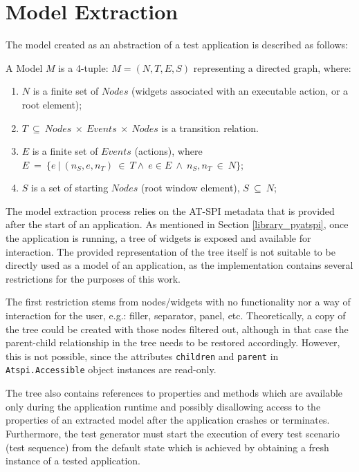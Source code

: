 \section{Model Extraction}\label{model}
 

The model created as an abstraction of a test application is described as follows: 

\theoremstyle{definition}
\begin{definition}
A Model $M$ is a 4-tuple: $M = (N, T, E, S)$ representing a directed graph, where:
\begin{enumerate}
\item $N$ is a finite set of $Nodes$ (widgets associated with an executable action, or a root element);
\item $T\ \subseteq\ Nodes\ \times \ Events\ \times \ Nodes$ is a transition relation.
\item $E$ is a finite set of $Events$ (actions), where  $E\ =\ \{e\ |\ (n_S, e, n_T)\ \in\ T \land \ e \in E \ \land \ n_S,n_T\ \in \ N\}$;
\item $S$ is a set of starting $Nodes$ (root window element), $S\ \subseteq\ N$;
\end{enumerate}
\end{definition}

The model extraction process relies on the AT-SPI metadata that is provided after the start of an application. As mentioned in Section \ref{library_pyatspi}, once the application is running, a tree of widgets is exposed and available for interaction. The provided representation of the tree itself is not suitable to be directly used as a model of an application, as the implementation contains several restrictions for the purposes of this work.

The first restriction stems from nodes/widgets with no functionality nor a way of interaction for the user, e.g.: filler, separator, panel, etc. Theoretically, a copy of the tree could be created with those nodes filtered out, although in that case the parent-child relationship in the tree needs to be restored accordingly. However, this is not possible, since the attributes \texttt{children} and \texttt{parent} in \texttt{Atspi.Accessible} object instances are read-only. 

The tree also contains references to properties and methods which are available only during the application runtime and possibly disallowing access to the properties of an extracted model after the application crashes or terminates. Furthermore, the test generator must start the execution of every test scenario (test sequence) from the default state which is achieved by obtaining a fresh instance of a tested application.

